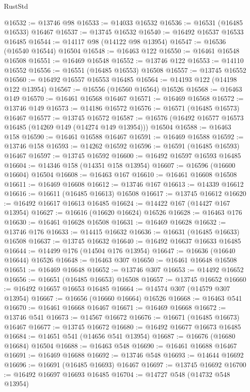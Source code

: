 \begin{lexlean}{RustStd}
\begin{coremodule}
@16532 := @13746 @98
@16533 := @14033 @16532
@16536 := @16531 (@16485 @16533) @16467
@16537 := @13745 @16532
@16540 := @16492 @16537 @16533 @16485
@16544 := @14117 @98 (@14122 @98 @13954)
@16547 := @16536 (@16540 @16544) @16504
@16548 := @16463 @122
@16550 := @16461 @16548 @16508
@16551 := @16469 @16548
@16552 := @13746 @122
@16553 := @14110 @16552
@16556 := @16551 (@16485 @16553) @16508
@16557 := @13745 @16552
@16560 := @16492 @16557 @16553 @16485
@16564 := @14193 @122 (@14198 @122 @13954)
@16567 := @16556 (@16560 @16564) @16526
@16568 := @16463 @149
@16570 := @16461 @16568 @16467
@16571 := @16469 @16568
@16572 := @13746 @149
@16573 := @14186 @16572
@16576 := @16571 (@16485 @16573) @16467
@16577 := @13745 @16572
@16587 := @16576 (@16492 @16577 @16573 @16485 (@14269 @149 (@14274 @149 @13954))) @16504
@16588 := @16463 @158
@16590 := @16461 @16588 @16467
@16591 := @16469 @16588
@16592 := @13746 @158
@16593 := @14262 @16592
@16596 := @16591 (@16485 @16593) @16467
@16597 := @13745 @16592
@16600 := @16492 @16597 @16593 @16485
@16604 := @14346 @158 (@14351 @158 @13954)
@16607 := @16596 (@16600 @16604) @16504
@16608 := @16463 @167
@16610 := @16461 @16608 @16508
@16611 := @16469 @16608
@16612 := @13746 @167
@16613 := @14339 @16612
@16616 := @16611 (@16485 @16613) @16508
@16617 := @13745 @16612
@16620 := @16492 @16617 @16613 @16485
@16624 := @14422 @167 (@14427 @167 @13954)
@16627 := @16616 (@16620 @16624) @16526
@16628 := @16463 @176
@16630 := @16461 @16628 @16508
@16631 := @16469 @16628
@16632 := @13746 @176
@16633 := @14415 @16632
@16636 := @16631 (@16485 @16633) @16508
@16637 := @13745 @16632
@16640 := @16492 @16637 @16633 @16485
@16644 := @14499 @176 (@14504 @176 @13954)
@16647 := @16636 (@16640 @16644) @16526
@16648 := @16463 @307
@16650 := @16461 @16648 @16508
@16651 := @16469 @16648
@16652 := @13746 @307
@16653 := @14492 @16652
@16656 := @16651 (@16485 @16653) @16508
@16657 := @13745 @16652
@16660 := @16492 @16657 @16653 @16485
@16664 := @14574 @307 (@14579 @307 @13954)
@16667 := @16656 (@16660 @16664) @16526
@16668 := @16463 @541
@16670 := @16461 @16668 @16467
@16671 := @16469 @16668
@16672 := @13746 @541
@16673 := @14567 @16672
@16676 := @16671 (@16485 @16673) @16467
@16677 := @13745 @16672
@16680 := @16492 @16677 @16673 @16485
@16684 := @14651 @541 (@14656 @541 @13954)
@16687 := @16676 (@16680 @16684) @16504
@16688 := @16463 @548
@16690 := @16461 @16688 @16467
@16691 := @16469 @16688
@16692 := @13746 @548
@16693 := @14644 @16692
@16696 := @16691 (@16485 @16693) @16467
@16697 := @13745 @16692
@16700 := @16492 @16697 @16693 @16485
@16704 := @14727 @548 (@14732 @548 @13954)

\end{coremodule}
\end{lexlean}
